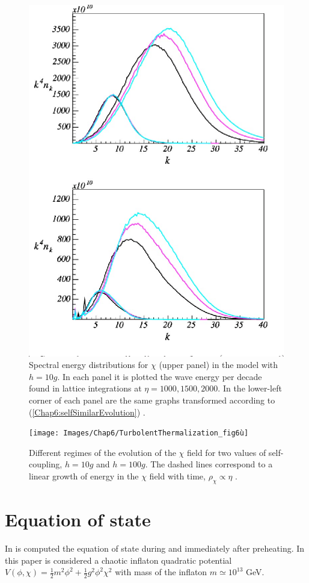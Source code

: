 \documentclass[11pt,a4paper,twoside]{book}
\begin{document}
\begin{figure}
	\centering
	\includegraphics[width=0.6\linewidth, height=0.35\textheight]{Images/Chap6/TurbolentThermalization_fig5}
	\caption{Spectral energy distributions for $\chi$ (upper panel) in the model with $ h=10g $. In each panel it is plotted the wave energy per decade found in lattice integrations at $\eta = 1000, 1500, 2000$. In the lower-left corner of each panel are the same graphs transformed according to (\ref{Chap6:selfSimilarEvolution}) \cite{Chap6:TurbolentThermalization}.}
	\label{fig:turbolentThermalizationfig5}
\end{figure}
\begin{figure}
	\centering
	\texttt{[image: Images/Chap6/TurbolentThermalization\_fig6ù]}
	\caption{Different regimes of the evolution of the $\chi$ field for two values of self-coupling, $ h=10g $ and $ h=100g $. The dashed lines correspond to a linear growth of energy in the $\chi$ field with time, $\rho_{\chi} \propto \eta$ \cite{Chap6:TurbolentThermalization}.}
	\label{fig:turbolentThermalizationfig6u}
\end{figure}

\section{Equation of state}
In \cite{Chap7:Peloso_Thermalization} is computed the equation of state during and immediately after preheating. In this paper is considered a chaotic inflaton quadratic potential $ V(\phi,\chi)=\frac{1}{2}m^{2}\phi^{2}+\frac{1}{2}g^{2}\phi^{2}\chi^{2} $ with  mass of the inflaton $ m\simeq 10^{13} $ GeV.
\end{document}
